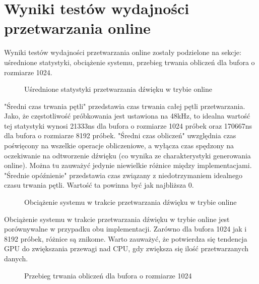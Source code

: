 \section{Wyniki testów wydajności przetwarzania online}
Wyniki testów wydajności przetwarzania online zostały podzielone na sekcje: uśrednione statystyki, obciążenie systemu, przebieg trwania obliczeń dla bufora o rozmiarze 1024.

\begin{figure}[H]
    \centering
    \scalebox{1.0}{}
    \caption{Uśrednione statystyki przetwarzania dźwięku w trybie online}
    \label{fig:Uśrednione statystyki przetwarzania dźwięku w trybie online}
\end{figure}

"Średni czas trwania pętli" przedstawia czas trwania całej pętli przetwarzania. Jako, że częstotliwość próbkowania jest ustawiona na 48kHz, to idealna wartość tej statystyki wynosi 21333ns dla bufora o rozmiarze 1024 próbek oraz 170667ns dla bufora o rozmiarze 8192 próbek. "Średni czas obliczeń" uwzględnia czas poświęcony na wszelkie operacje obliczeniowe, a wyłącza czas spędzony na oczekiwanie na odtworzenie dźwięku (co wynika ze charakterystyki generowania online). Można tu zauważyć jedynie niewielkie różnice między implementacjami. "Średnie opóźnienie" przedstawia czas związany z niedotrzymaniem idealnego czasu trwania pętli. Wartość ta powinna być jak najbliższa 0.

\begin{figure}[H]
    \centering
    \scalebox{1.0}{}
    \caption{Obciążenie systemu w trakcie przetwarzania dźwięku w trybie online}
    \label{fig:Obciążenie systemu w trakcie przetwarzania dźwięku w trybie online}
\end{figure}

Obciążenie systemu w trakcie przetwarzania dźwięku w trybie online jest porównywalne w przypadku obu implementacji. Zarówno dla bufora 1024 jak i 8192 próbek, różnice są znikome. Warto zauważyć, że potwierdza się tendencja GPU do zwiększania przewagi nad CPU, gdy zwiększa się ilość przetwarzanych danych.
\clearpage
\begin{figure}[H]
    \centering
    \scalebox{1.0}{}
    \caption{Przebieg trwania obliczeń dla bufora o rozmiarze 1024}
    \label{fig:Przebieg trwania obliczeń dla bufora o rozmiarze 1024}
\end{figure}

